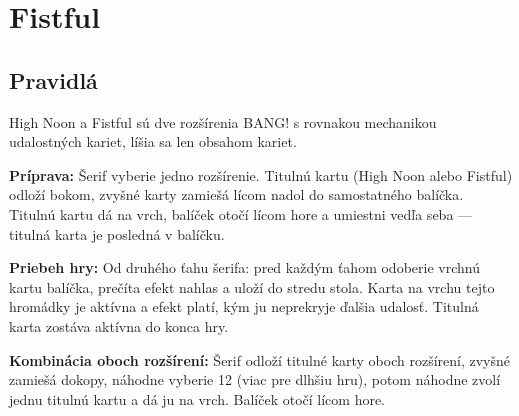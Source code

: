\chapter{Fistful}
\section*{Pravidlá}
\noindent High Noon a Fistful sú dve rozšírenia BANG! s rovnakou mechanikou udalostných kariet, líšia sa len obsahom kariet.

\textbf{Príprava:} Šerif vyberie jedno rozšírenie. Titulnú kartu (High Noon alebo Fistful) odloží bokom, zvyšné karty zamiešá lícom nadol do samostatného balíčka. Titulnú kartu dá na vrch, balíček otočí lícom hore a umiestni vedľa seba — titulná karta je posledná v balíčku.

\textbf{Priebeh hry:} Od druhého ťahu šerifa: pred každým ťahom odoberie vrchnú kartu balíčka, prečíta efekt nahlas a uloží do stredu stola. Karta na vrchu tejto hromádky je aktívna a efekt platí, kým ju neprekryje ďalšia udalosť. Titulná karta zostáva aktívna do konca hry.

\textbf{Kombinácia oboch rozšírení:} Šerif odloží titulné karty oboch rozšírení, zvyšné zamiešá dokopy, náhodne vyberie 12 (viac pre dlhšiu hru), potom náhodne zvolí jednu titulnú kartu a dá ju na vrch. Balíček otočí lícom hore.

